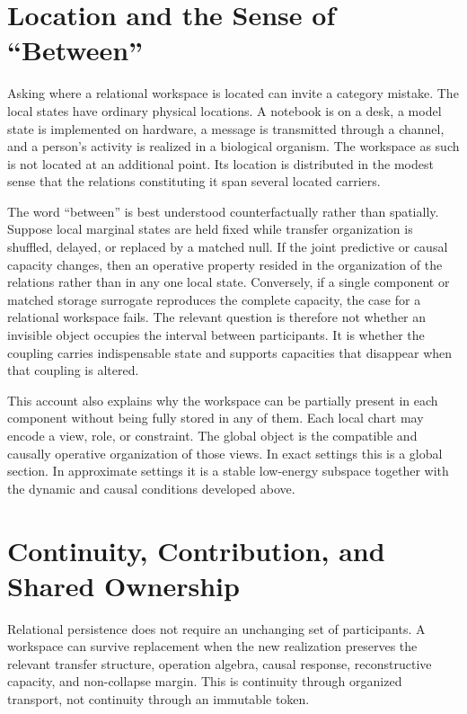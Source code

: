 \section{Location and the Sense of ``Between''}

Asking where a relational workspace is located can invite a category mistake. The local states have
ordinary physical locations. A notebook is on a desk, a model state is implemented on hardware, a
message is transmitted through a channel, and a person's activity is realized in a biological organism.
The workspace as such is not located at an additional point. Its location is distributed in the modest
sense that the relations constituting it span several located carriers.

The word ``between'' is best understood counterfactually rather than spatially. Suppose local marginal
states are held fixed while transfer organization is shuffled, delayed, or replaced by a matched null. If
the joint predictive or causal capacity changes, then an operative property resided in the organization of
the relations rather than in any one local state. Conversely, if a single component or matched storage
surrogate reproduces the complete capacity, the case for a relational workspace fails. The relevant
question is therefore not whether an invisible object occupies the interval between participants. It is
whether the coupling carries indispensable state and supports capacities that disappear when that
coupling is altered.

This account also explains why the workspace can be partially present in each component without being
fully stored in any of them. Each local chart may encode a view, role, or constraint. The global object is
the compatible and causally operative organization of those views. In exact settings this is a global
section. In approximate settings it is a stable low-energy subspace together with the dynamic and causal
conditions developed above.

\section{Continuity, Contribution, and Shared Ownership}

Relational persistence does not require an unchanging set of participants. A workspace can survive
replacement when the new realization preserves the relevant transfer structure, operation algebra,
causal response, reconstructive capacity, and non-collapse margin. This is continuity through organized
transport, not continuity through an immutable token.

